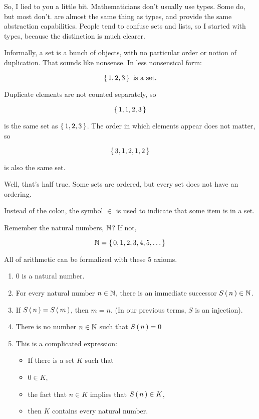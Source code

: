 
So, I lied to you a little bit. Mathematicians don't usually use types. Some do,
but most don't.  are almost the same thing as types, and provide the
same abstraction capabilities. People tend to confuse sets and lists, so I
started with types, because the distinction is much clearer.

Informally, a set is a bunch of objects, with no particular order or notion of
duplication. That sounds like nonsense. In less nonsensical form:

\begin{equation}
    \left\{\, 1,2,3 \,\right\} \text{ is a set.}
\end{equation}

Duplicate elements are not counted separately, so

\begin{equation}
    \left\{\, 1,1,2,3 \,\right\}
\end{equation}

is the same set as $\left\{\, 1,2,3 \,\right\}$. The order in which elements appear does not
matter, so 

\begin{equation}
    \left\{\, 3,1,2,1,2 \,\right\}
\end{equation}

is also the same set.

Well, that's half true. Some sets are ordered, but every set does not have an
ordering.

Instead of the colon, the symbol $\in$ is used to indicate that some item is in
a set.

Remember the natural numbers, $\mathbb{N}$? If not,

\begin{equation}
    \mathbb{N} = \left\{\, 0,1,2,3,4,5,\dots \,\right\}
\end{equation}

All of arithmetic can be formalized with these 5 axioms. \cite{taylor-analysis, landau-analysis}

\begin{enumerate}
  \item $0$ is a natural number.
  \item For every natural number $n \in \mathbb{N}$, there is an immediate successor
    $S \left(\, n \,\right) \in \mathbb{N}$.
  \item If $S \left(\, n \,\right) = S \left(\, m \,\right)$, then $m = n$. (In our previous terms, $S$ is
    an injection).
  \item There is no number $n \in \mathbb{N}$ such that $S \left(\, n \,\right) = 0$
  \item This is a complicated expression:

    \begin{itemize}
      \item If there is a set $K$ such that
      \item $0 \in K$,
      \item the fact that $n \in K$ implies that $S \left(\, n \,\right) \in K$,
      \item then $K$ contains every natural number.
    \end{itemize}
\end{enumerate}


